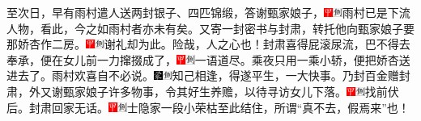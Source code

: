 至次日，早有雨村遣人送两封银子、四匹锦缎，答谢甄家娘子，{\includegraphics[width=3mm]{../Images/00002}\includegraphics[width=3mm]{../Images/00011}\footnotesize \kaishu 雨村已是下流人物，看此，今之如雨村者亦未有矣。}又寄一封密书与封肃，转托他向甄家娘子要那娇杏作二房。{\includegraphics[width=3mm]{../Images/00002}\includegraphics[width=3mm]{../Images/00011}\footnotesize \kaishu 谢礼却为此。险哉，人之心也！}封肃喜得屁滚尿流，巴不得去奉承，便在女儿前一力撺掇成了，{\includegraphics[width=3mm]{../Images/00002}\includegraphics[width=3mm]{../Images/00011}\footnotesize \kaishu 一语道尽。}乘夜只用一乘小轿，便把娇杏送进去了。雨村欢喜自不必说。{\includegraphics[width=3mm]{../Images/00006}\includegraphics[width=3mm]{../Images/00011}\footnotesize \kaishu 知己相逢，得遂平生，一大快事。}乃封百金赠封肃，外又谢甄家娘子许多物事，令其好生养赡，以待寻访女儿下落。{\includegraphics[width=3mm]{../Images/00002}\includegraphics[width=3mm]{../Images/00011}\footnotesize \kaishu 找前伏后。}封肃回家无话。{\includegraphics[width=3mm]{../Images/00002}\includegraphics[width=3mm]{../Images/00011}\footnotesize \kaishu 士隐家一段小荣枯至此结住，所谓``真不去，假焉来''也！}

